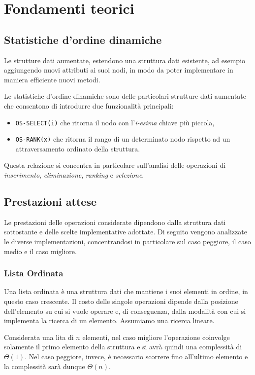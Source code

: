 \section{Fondamenti teorici}
\subsection{Statistiche d'ordine dinamiche}

Le strutture dati aumentate, estendono una struttura dati esistente, ad esempio aggiungendo nuovi attributi ai suoi nodi, in modo da poter implementare in maniera efficiente nuovi metodi.

Le statistiche d'ordine dinamiche sono delle particolari strutture dati aumentate che consentono di introdurre due funzionalità principali:
\begin{itemize}
	\item \texttt{OS-SELECT(i)} che ritorna il nodo con l'\textit{i-esima} chiave più piccola,
	\item \texttt{OS-RANK(x)} che ritorna il rango di un determinato nodo rispetto ad un attraversamento ordinato della struttura.
\end{itemize}

Questa relazione si concentra in particolare sull'analisi delle operazioni di \textit{inserimento}, \textit{eliminazione}, \textit{ranking} e \textit{selezione}.

\subsection{Prestazioni attese}
Le prestazioni delle operazioni considerate dipendono dalla struttura dati sottostante e delle scelte implementative adottate. Di seguito vengono analizzate le diverse implementazioni, concentrandosi in particolare sul caso peggiore, il caso medio e il caso migliore.

\subsubsection*{Lista Ordinata}
Una lista ordinata è una struttura dati che mantiene i suoi elementi in ordine, in questo caso crescente. Il costo delle singole operazioni dipende dalla posizione dell'elemento su cui si vuole operare e, di conseguenza, dalla modalità con cui si implementa la ricerca di un elemento. Assumiamo una ricerca lineare.

Considerata una lita di $n$ elementi, nel caso migliore l'operazione coinvolge solamente il primo elemento della struttura e si avrà quindi una complessità di $\Theta(1)$.  Nel caso peggiore, invece, è necessario scorrere fino all'ultimo elemento e la complessità sarà dunque $\Theta(n)$. 

